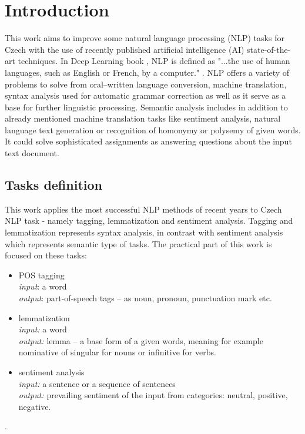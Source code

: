 \chapter*{Introduction}

This work aims to improve some natural language processing (NLP) tasks for Czech  with the use of recently published artificial intelligence (AI) state-of-the-art techniques. In Deep Learning book %
, NLP is defined as "...the use of human languages, such as English or French, by a computer." \cite[]{Goodfellow-et-al-2016}. NLP offers a variety of problems to solve from oral--written language conversion, machine translation, syntax analysis used for automatic grammar correction as well as it serve as a base for further linguistic processing. Semantic analysis includes in addition to already mentioned machine translation tasks like sentiment analysis, natural language text generation or recognition
of homonymy or polysemy of given words. It could solve sophisticated assignments as answering questions about the input text document.

\cite{BERT_ORIG}
\section*{Tasks definition}
This work applies the most successful NLP methods of recent years to Czech NLP task - namely tagging, lemmatization and sentiment analysis. Tagging and lemmatization represents syntax analysis, in contrast with sentiment analysis which represents semantic type of tasks. 
The practical part of this work is focused on these tasks:
\begin{itemize}
\item POS tagging \\
\textit{input}: a word \\
\textit{output}: part-of-speech tags -- as noun, pronoun, punctuation mark etc.
\item lemmatization \\
\textit{input:} a word \\
\textit{output:} lemma -- a base form of a given words, meaning for example nominative of singular for nouns or infinitive for verbs. 
\item sentiment analysis \\
\textit{input:} a sentence or a sequence of sentences \\
\textit{output:} prevailing sentiment of the input from categories: neutral, positive, negative.
\end{itemize}.

